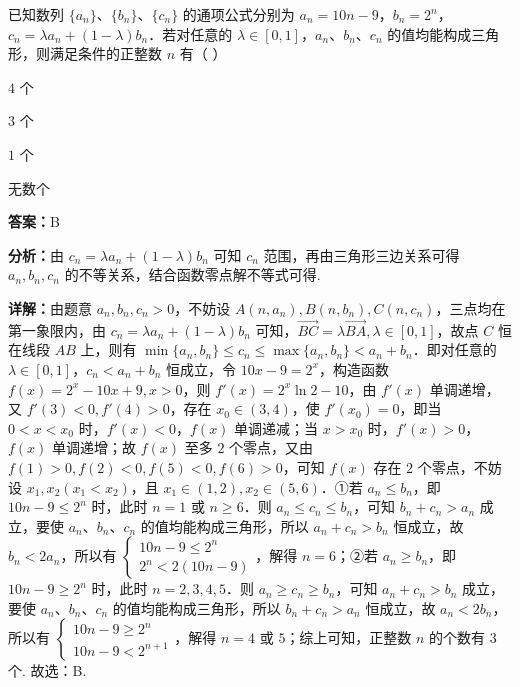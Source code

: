 \begin{question}[points=5]
已知数列 $\{a_n\}$、$\{b_n\}$、$\{c_n\}$ 的通项公式分别为 $a_n = 10n - 9$，$b_n = 2^n$，$c_n = \lambda a_n + (1-\lambda)b_n$．若对任意的 $\lambda \in [0,1]$，$a_n$、$b_n$、$c_n$ 的值均能构成三角形，则满足条件的正整数 $n$ 有（ ）
\begin{choices}
  \item $4$ 个
  \item $3$ 个
  \item $1$ 个
  \item 无数个
\end{choices}
\begin{solution}
\textbf{答案：}B

\textbf{分析：}由 $c_n = \lambda a_n + (1-\lambda)b_n$ 可知 $c_n$ 范围，再由三角形三边关系可得 $a_n, b_n, c_n$ 的不等关系，结合函数零点解不等式可得.

\textbf{详解：}由题意 $a_n, b_n, c_n > 0$，不妨设 $A(n, a_n), B(n, b_n), C(n, c_n)$，三点均在第一象限内，由 $c_n = \lambda a_n + (1-\lambda)b_n$ 可知，$\overrightarrow{BC} = \lambda \overrightarrow{BA}, \lambda \in [0,1]$，故点 $C$ 恒在线段 $AB$ 上，则有 $\min\{a_n, b_n\} \leq c_n \leq \max\{a_n, b_n\} < a_n + b_n$．即对任意的 $\lambda \in [0,1]$，$c_n < a_n + b_n$ 恒成立，令 $10x - 9 = 2^x$，构造函数 $f(x) = 2^x - 10x + 9, x > 0$，则 $f'(x) = 2^x \ln 2 - 10$，由 $f'(x)$ 单调递增，又 $f'(3) < 0, f'(4) > 0$，存在 $x_0 \in (3,4)$，使 $f'(x_0) = 0$，即当 $0 < x < x_0$ 时，$f'(x) < 0$，$f(x)$ 单调递减；当 $x > x_0$ 时，$f'(x) > 0$，$f(x)$ 单调递增；故 $f(x)$ 至多 $2$ 个零点，又由 $f(1) > 0, f(2) < 0, f(5) < 0, f(6) > 0$，可知 $f(x)$ 存在 $2$ 个零点，不妨设 $x_1, x_2 (x_1 < x_2)$，且 $x_1 \in (1,2), x_2 \in (5,6)$．①若 $a_n \leq b_n$，即 $10n - 9 \leq 2^n$ 时，此时 $n = 1$ 或 $n \geq 6$．则 $a_n \leq c_n \leq b_n$，可知 $b_n + c_n > a_n$ 成立，要使 $a_n$、$b_n$、$c_n$ 的值均能构成三角形，所以 $a_n + c_n > b_n$ 恒成立，故 $b_n < 2a_n$，所以有 $\begin{cases} 10n - 9 \leq 2^n \\ 2^n < 2(10n - 9) \end{cases}$，解得 $n = 6$；②若 $a_n \geq b_n$，即 $10n - 9 \geq 2^n$ 时，此时 $n = 2,3,4,5$．则 $a_n \geq c_n \geq b_n$，可知 $a_n + c_n > b_n$ 成立，要使 $a_n$、$b_n$、$c_n$ 的值均能构成三角形，所以 $b_n + c_n > a_n$ 恒成立，故 $a_n < 2b_n$，所以有 $\begin{cases} 10n - 9 \geq 2^n \\ 10n - 9 < 2^{n+1} \end{cases}$，解得 $n = 4$ 或 $5$；综上可知，正整数 $n$ 的个数有 $3$ 个. 故选：B.
\end{solution}
\end{question}

